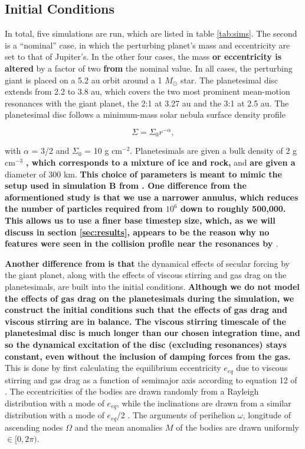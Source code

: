 \documentclass[fleqn,usenatbib]{mnras}
\begin{document}
\subsection{Initial Conditions}\label{sec:ics}

In total, five simulations are run, which are listed in table \ref{tab:sims}. The second is a ``nominal'' case, in which the perturbing planet's mass and eccentricity are set to that of Jupiter's. 
In the other four cases, the mass \textbf{or eccentricity is altered} by a factor of two \textbf{from} the nominal value. In all cases, the perturbing giant is placed on a 5.2 au orbit around a 1 
$M_{\odot}$ star. The planetesimal disc extends from 2.2 to 3.8 au, which covers the two most prominent mean-motion resonances with the giant planet, the 2:1 at 3.27 au and the 3:1 at 
2.5 au. The planetesimal disc follows a minimum-mass solar nebula surface density profile \citep{1981PThPS..70...35H}

\begin{equation}\label{eq:surf_den}
	\Sigma = \Sigma_{0} r^{-\alpha},
\end{equation}

\noindent with $\alpha$ = 3/2 and $\Sigma_{0}$ = 10 g cm$^{-2}$. Planetesimals are given a bulk density of 2 g cm$^{-3}$ \textbf{, which corresponds to a mixture of ice and rock,} and 
\textbf{are given a} diameter of 300 km. \textbf{This choice of parameters is meant to mimic the setup used in simulation B from \citet{2000Icar..143...45R}. One difference from the 
aformentioned study is that we use a narrower annulus, which reduces the number of particles required from $10^6$ down to roughly 500,000. This allows us to use a finer base timestep 
size, which, as we will discuss in section \ref{sec:results}, appears to be the reason why no features were seen in the collision profile near the resonances by \citet{2000Icar..143...45R}}.

\textbf{Another difference from \citet{2000Icar..143...45R} is that} the dynamical effects of secular forcing by the giant planet, along with the effects of viscous stirring and gas drag on the 
planetesimals, are built into the initial conditions. \textbf{Although we do not model the effects of gas drag on the planetesimals during the simulation, we construct the initial conditions 
such that the effects of gas drag and viscous stirring are in balance. The viscous stirring timescale of the planetesimal disc is much longer than our chosen integration time, and so the 
dynamical excitation of the disc (excluding resonances) stays constant, even without the inclusion of damping forces from the gas.} This is done by first calculating the equilibrium 
eccentricity $e_{eq}$ due to viscous stirring and gas drag as a function of semimajor axis according to equation 12 of \citet{2002ApJ...581..666K}. The eccentricities of the bodies are 
drawn randomly from a Rayleigh distribution with a mode of $e_{eq}$, while the inclinations are drawn from a similar distribution with a mode of $e_{eq}$/2 \citep{1993MNRAS.263..875I}. 
The arguments of perihelion $\omega$, longitude of ascending nodes $\Omega$ and the mean anomalies $M$ of the bodies are drawn uniformly $\in [0, 2 \pi)$.
\end{document}
